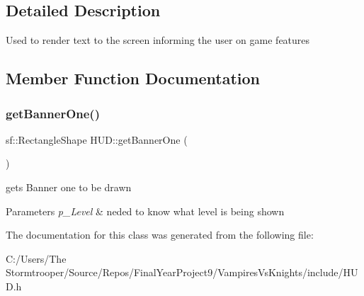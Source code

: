 \subsection{Detailed Description}
Used to render text to the screen informing the user on game features 

\subsection{Member Function Documentation}
\mbox{\label{class_h_u_d_afb3ca25c4b8f2c27bb45712472b8c3b3}} 
\subsubsection{\texorpdfstring{get\+Banner\+One()}{getBannerOne()}}
{\footnotesize\ttfamily sf\+::\+Rectangle\+Shape H\+U\+D\+::get\+Banner\+One (\begin{DoxyParamCaption}{ }\end{DoxyParamCaption})}



gets Banner one to be drawn 


\begin{DoxyParams}{Parameters}
{\em p\+\_\+\+Level} & neded to know what level is being shown \\
\hline
\end{DoxyParams}


The documentation for this class was generated from the following file\+:\begin{DoxyCompactItemize}
\item 
C\+:/\+Users/\+The Stormtrooper/\+Source/\+Repos/\+Final\+Year\+Project9/\+Vampires\+Vs\+Knights/include/H\+U\+D.\+h\end{DoxyCompactItemize}
